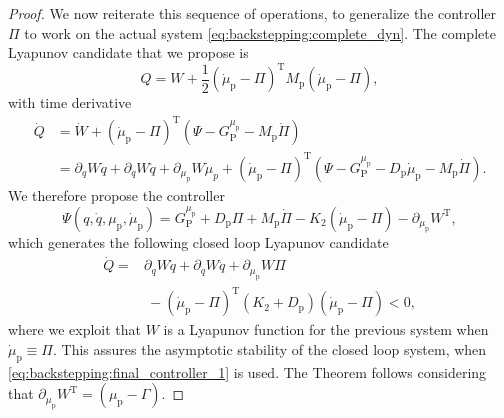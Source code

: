 \begin{proof}
	We now reiterate this sequence of operations, to generalize the controller $\Pi$ to work on the actual system \eqref{eq:backstepping:complete_dyn}.
	The complete Lyapunov candidate that we propose is
	\begin{equation}
		Q = W + \frac{1}{2}(\dot{\mu}_\mathrm{p} - \Pi)^{\mathrm{T}} M_\mathrm{p} (\dot{\mu}_\mathrm{p} - \Pi),
	\end{equation}
	with time derivative
	\begin{equation*}
		\begin{split}
			\dot{Q} &= \dot{W} + (\dot{\mu}_\mathrm{p} - \Pi)^{\mathrm{T}} (\Psi - G_{\mathrm{P}}^{\mu_\mathrm{p}} - M_\mathrm{p} \dot{\Pi}) \\
			 &= \partial_{q} W \dot{q} + \partial_{\dot{q}} W \ddot{q} + \partial_{\mu_\mathrm{p}} W \dot{\mu}_p + (\dot{\mu}_\mathrm{p} - \Pi)^{\mathrm{T}} (\Psi - G_{\mathrm{P}}^{\mu_\mathrm{p}} - D_\mathrm{p} \dot{\mu}_\mathrm{p} - M_\mathrm{p} \dot{\Pi}) .
		\end{split}
	\end{equation*}
	We therefore propose the controller
	\begin{equation}\label{eq:backstepping:final_controller_1}
	    \Psi(q, \dot{q}, \mu_\mathrm{p}, \dot{\mu}_\mathrm{p}) = G_{\mathrm{P}}^{\mu_\mathrm{p}} + D_\mathrm{p} \Pi + M_\mathrm{p} \dot{\Pi} - K_2 (\dot{\mu}_\mathrm{p} - \Pi) 
	    - \partial_{\mu_\mathrm{p}} W^{\mathrm{T}}\!,
	\end{equation}
	which generates the following closed loop Lyapunov candidate
	\begin{equation}
	    \begin{split}
			\dot{Q} =& \partial_{q} W \dot{q} + \partial_{\dot{q}} W \ddot{q} + \partial_{\mu_\mathrm{p}} W \Pi \\
			&\: - (\dot{\mu}_\mathrm{p} - \Pi)^{\mathrm{T}} (K_2 + D_\mathrm{p}) (\dot{\mu}_\mathrm{p} - \Pi)
			< 0,
	    \end{split}
	\end{equation}
	where we exploit that $W$ is a Lyapunov function for the previous system when $\dot{\mu}_\mathrm{p} \equiv \Pi$. This assures the asymptotic stability of the closed loop system, when \eqref{eq:backstepping:final_controller_1} is used. The Theorem follows considering that $\partial_{\mu_\mathrm{p}} W^{\mathrm{T}} = (\mu_\mathrm{p} - \Gamma)$.
	

\end{proof}
